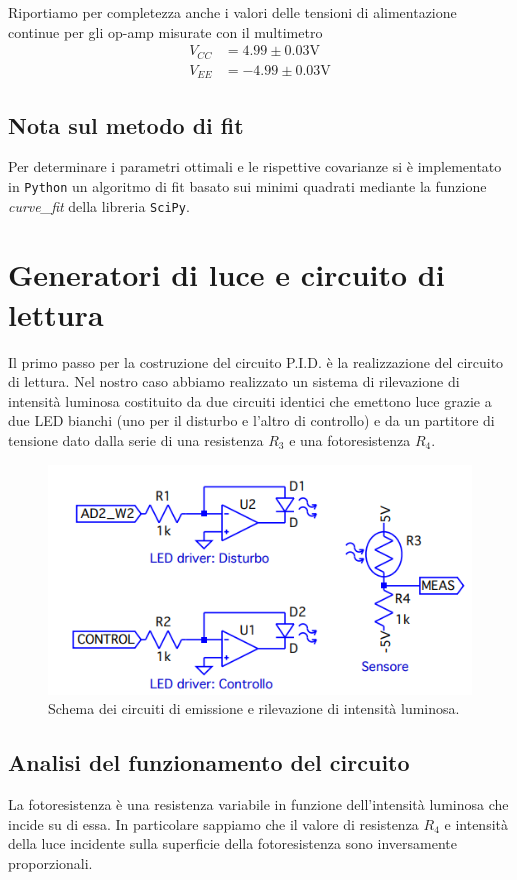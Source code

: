 \documentclass[10pt, a4paper, italian]{article}
\begin{document}
Riportiamo per completezza anche i valori delle tensioni di alimentazione
continue per gli op-amp misurate con il multimetro
\begin{align*}
V_{CC} &= 4.99 \pm 0.03 \si{\V} \\
V_{EE} &= -4.99 \pm 0.03 \si{\V}
\end{align*}

\subsection{Nota sul metodo di fit}
Per determinare i parametri ottimali e le rispettive covarianze si \`e
implementato in \verb+Python+ un algoritmo di fit basato sui minimi quadrati
mediante la funzione \emph{curve\_fit} della libreria \texttt{SciPy}.

\setcounter{section}{2}
\section{Generatori di luce e circuito di lettura}
Il primo passo per la costruzione del circuito P.I.D. è la realizzazione del
circuito di lettura. Nel nostro caso abbiamo realizzato un sistema di
rilevazione di intensità luminosa costituito da due circuiti identici che
emettono luce grazie a due LED bianchi (uno per il disturbo e l'altro di
controllo) e da un partitore di tensione dato dalla serie di una resistenza
$R_3$ e una fotoresistenza $R_4$.

\begin{figure}[htbp]
    \centering
	\includegraphics[scale=0.7]{noisegen}
    \caption{Schema dei circuiti di emissione e rilevazione di intensità
    luminosa.
    \label{schm: mesctrl}}
\end{figure}

\subsection{Analisi del funzionamento del circuito}
La fotoresistenza è una resistenza variabile in funzione dell'intensità
luminosa che incide su di essa. In particolare sappiamo che il valore di
resistenza $R_4$ e intensità della luce incidente sulla superficie della
fotoresistenza sono inversamente proporzionali.
\end{document}
